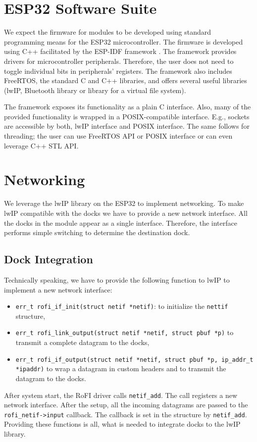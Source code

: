 \section{ESP32 Software Suite} \label{sec:hardware}

We expect the firmware for modules to be developed using standard programming
means for the ESP32 microcontroller. The firmware is developed using C++
facilitated by the ESP-IDF framework \cite{noauthor_esp-idf_nodate}. The
framework provides drivers for microcontroller peripherals. Therefore, the user
does not need to toggle individual bits in peripherals' registers. The framework
also includes FreeRTOS, the standard C and C++ libraries, and offers several
useful libraries (lwIP, Bluetooth library or library for a virtual file
system).

The framework exposes its functionality as a plain C interface. Also, many of
the provided functionality is wrapped in a POSIX-compatible interface. E.g.,
sockets are accessible by both, lwIP interface and POSIX interface. The same
follows for threading; the user can use FreeRTOS API or POSIX interface or can
even leverage C++ STL API.

\section{Networking} \label{sec:networking}

We leverage the lwIP library on the ESP32 to implement networking. To make lwIP
compatible with the docks we have to provide a new network interface.
All the docks in the module appear as a single interface. Therefore, the
interface performs simple switching to determine the destination dock.

\subsection{Dock Integration}

Technically speaking, we have to provide the following function to lwIP to
implement a new network interface:
\begin{itemize}
    \item \texttt{err_t rofi_if_init(struct netif *netif)}:
    to initialize the \texttt{nettif} structure,
    \item \texttt{err_t rofi_link_output(struct netif *netif, struct pbuf *p)}
    to transmit a complete datagram to the docks,
    \item \texttt{err\_t rofi\_if\_output(struct netif *netif, struct pbuf *p, ip\_addr\_t *ipaddr)}
    to wrap a datagram in custom headers and to transmit the datagram to the
    docks.
\end{itemize}
After system start, the RoFI driver calls \texttt{netif\_add}. The call
registers a new network interface. After the setup, all the incoming datagrams
are passed to the \texttt{rofi\_netif->input} callback. The callback is set in
the structure by \texttt{netif\_add}. Providing these functions is all, what is
needed to integrate docks to the lwIP library.


